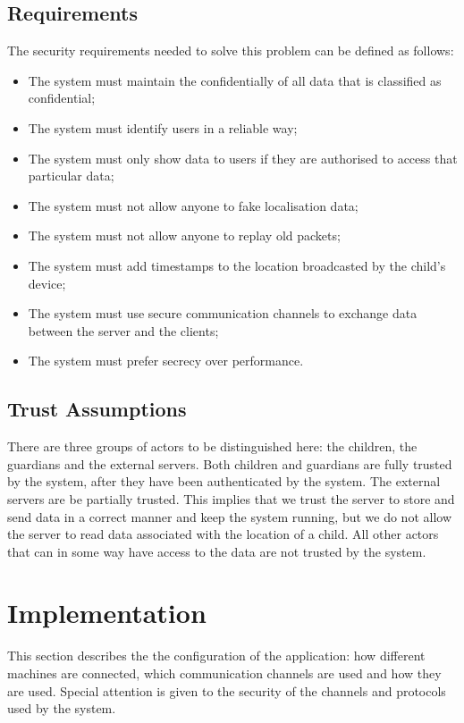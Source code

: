 \documentclass[a4paper]{article}
\begin{document}
\subsection{Requirements}

The security requirements needed to solve this problem can be defined as follows:
\begin{itemize}
    \item The system must maintain the confidentially of all data that is classified as confidential;
    \item The system must identify users in a reliable way;
    \item The system must only show data to users if they are authorised to access that particular data;
    \item The system must not allow anyone to fake localisation data;
    \item The system must not allow anyone to replay old packets;
    \item The system must add timestamps to the location broadcasted by the child's device;
    \item The system must use secure communication channels to exchange data between the server and the clients;
    \item The system must prefer secrecy over performance.
\end{itemize}

\subsection{Trust Assumptions}
There are three groups of actors to be distinguished here: the children, the guardians and the external servers. Both children and guardians are fully trusted by the system, after they have been authenticated by the system. The external servers are be partially trusted. This implies that we trust the server to store and send data in a correct manner and keep the system running, but we do not allow the server to read data associated with the location of a child. All other actors that can in some way have access to the data are not trusted by the system.

\section{Implementation}
This section describes the the configuration of the application: how different machines are connected, which communication channels are used and how they are used. Special attention is given to the security of the channels and protocols used by the system.
\end{document}
